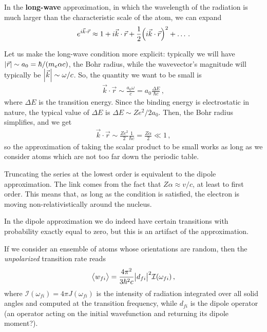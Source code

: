 \documentclass[main.tex]{subfiles}
\begin{document}
In the \textbf{long-wave} approximation, in which the wavelength of the radiation is much larger than the characteristic scale of the atom, we can expand 
%
\begin{align}
e^{i \vec{k} \cdot \vec{r}} \approx 1 + i \vec{k} \cdot \vec{r} + \frac{1}{2} \qty(i \vec{k} \cdot \vec{r})^2 + \dots
\,.
\end{align}

Let us make the long-wave condition more explicit: typically we will have \(\abs{\vec{r}} \sim a_0 = \hbar / (m_e \alpha c)\), the Bohr radius, while the wavevector's magnitude will typically be \(\abs{\vec{k}} \sim \omega / c\). So, the quantity we want to be small is 
%
\begin{align}
\vec{k} \cdot \vec{r} \sim \frac{a_0 \omega }{c} = a_0 \frac{\Delta E}{\hbar c} 
\,,
\end{align}
%
where \(\Delta E\) is the transition energy.
Since the binding energy is electrostatic in nature, the typical value of \(\Delta E\) is \(\Delta E \sim Z e^2 / 2 a_0 \). Then, the Bohr radius simplifies, and we get 
%
\begin{align}
\vec{k} \cdot \vec{r} \sim \frac{Z e^2}{2} \frac{1}{\hbar c} = \frac{Z \alpha }{2} \ll 1
\,,
\end{align}
%
so the approximation of taking the scalar product to be small works as long as we consider atoms which are not too far down the periodic table. 

Truncating the series at the lowest order is equivalent to the dipole approximation. The link comes from the fact that \(Z \alpha \approx v / c\), at least to first order. 
This means that, as long as the condition is satisfied, the electron is moving non-relativistically around the nucleus.  

In the dipole approximation we do indeed have certain transitions with probability exactly equal to zero, but this is an artifact of the approximation. 

If we consider an ensemble of atoms whose orientations are random, then the \emph{unpolarized} transition rate reads 
%
\begin{align}
\expval{w_{fi}} = \frac{4 \pi^2}{3 \hbar^2 c}
\abs{d_{fi}}^2 \mathcal{I}(\omega_{fi})
\,,
\end{align}
%
where \(\mathcal{I}(\omega _{fi}) = 4 \pi J(\omega _{fi})\) is the intensity of radiation integrated over all solid angles and computed at the transition frequency, while \(d_{fi}\) is the dipole operator (an operator acting on the initial wavefunction and returning its dipole moment?). 
\end{document}

